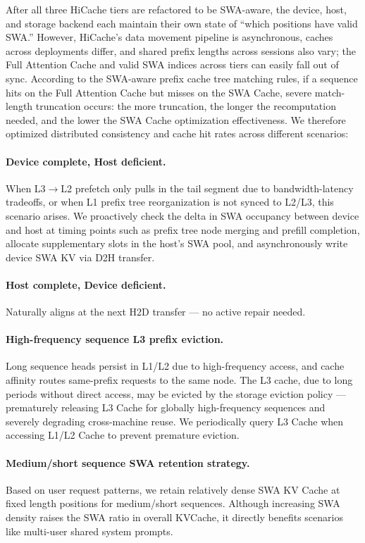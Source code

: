 After all three HiCache tiers are refactored to be SWA-aware, the device, host, and storage backend each maintain their own state of ``which positions have valid SWA.'' However, HiCache's data movement pipeline is asynchronous, caches across deployments differ, and shared prefix lengths across sessions also vary; the Full Attention Cache and valid SWA indices across tiers can easily fall out of sync. According to the SWA-aware prefix cache tree matching rules, if a sequence hits on the Full Attention Cache but misses on the SWA Cache, severe match-length truncation occurs: the more truncation, the longer the recomputation needed, and the lower the SWA Cache optimization effectiveness. We therefore optimized distributed consistency and cache hit rates across different scenarios:

\paragraph{Device complete, Host deficient.} When L3$\to$L2 prefetch only pulls in the tail segment due to bandwidth-latency tradeoffs, or when L1 prefix tree reorganization is not synced to L2/L3, this scenario arises. We proactively check the delta in SWA occupancy between device and host at timing points such as prefix tree node merging and prefill completion, allocate supplementary slots in the host's SWA pool, and asynchronously write device SWA KV via D2H transfer.

\paragraph{Host complete, Device deficient.} Naturally aligns at the next H2D transfer --- no active repair needed.

\paragraph{High-frequency sequence L3 prefix eviction.} Long sequence heads persist in L1/L2 due to high-frequency access, and cache affinity routes same-prefix requests to the same node. The L3 cache, due to long periods without direct access, may be evicted by the storage eviction policy --- prematurely releasing L3 Cache for globally high-frequency sequences and severely degrading cross-machine reuse. We periodically query L3 Cache when accessing L1/L2 Cache to prevent premature eviction.

\paragraph{Medium/short sequence SWA retention strategy.} Based on user request patterns, we retain relatively dense SWA KV Cache at fixed length positions for medium/short sequences. Although increasing SWA density raises the SWA ratio in overall KVCache, it directly benefits scenarios like multi-user shared system prompts.

